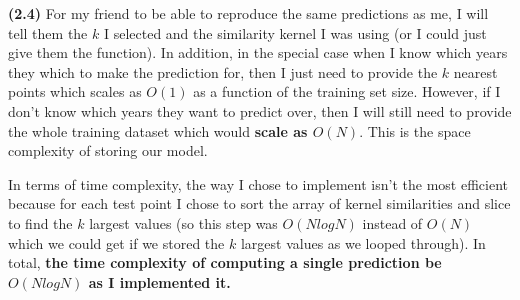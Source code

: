 \documentclass[submit]{harvardml}
\renewcommand{\part}[1] {\vspace{.10in} {\bf (#1)}}
\begin{document}
\part{2.4} For my friend to be able to reproduce the same predictions as me, I will tell them the $k$ I selected and the similarity kernel I was using (or I could just give them the function). In addition, in the special case when I know which years they which to make the prediction for, then I just need to provide the $k$ nearest points which scales as $O(1)$ as a function of the training set size. However, if I don't know which years they want to predict over, then I will still need to provide the whole training dataset which would \textbf{scale as $O(N)$}. This is the space complexity of storing our model.

In terms of time complexity, the way I chose to implement isn't the most efficient because for each test point I chose to sort the array of kernel similarities and slice to find the $k$ largest values (so this step was $O(NlogN)$ instead of $O(N)$ which we could get if we stored the $k$ largest values as we looped through). In total, \textbf{the time complexity of computing a single prediction be $O(NlogN)$ as I implemented it.}

\newpage

\end{document}
